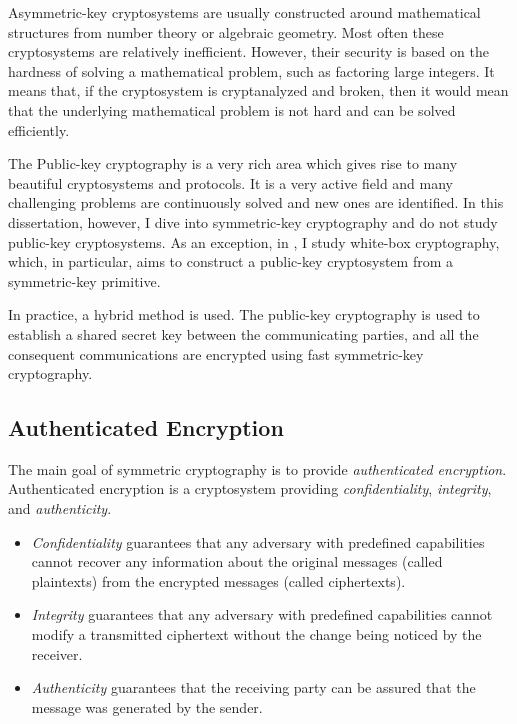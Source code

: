 Asymmetric-key cryptosystems are usually constructed around mathematical structures from number theory or algebraic geometry. Most often these cryptosystems are relatively inefficient. However, their security is based on the hardness of solving a mathematical problem, such as factoring large integers. It means that, if the cryptosystem is cryptanalyzed and broken, then it would mean that the underlying mathematical problem is not hard and can be solved efficiently.

The Public-key cryptography is a very rich area which gives rise to many beautiful cryptosystems and protocols. It is a very active field and many challenging problems are continuously solved and new ones are identified. In this dissertation, however, I dive into symmetric-key cryptography and do not study public-key cryptosystems. As an exception, in , I study white-box cryptography, which, in particular, aims to construct a public-key cryptosystem from a symmetric-key primitive. 

In practice, a hybrid method is used. The public-key cryptography is used to establish a shared secret key between the communicating parties, and all the consequent communications are encrypted using fast symmetric-key cryptography.


\subsection{Authenticated Encryption}

The main goal of symmetric cryptography is to provide \emph{authenticated encryption}. Authenticated encryption is a cryptosystem providing \emph{confidentiality}, \emph{integrity}, and \emph{authenticity}.
\begin{itemize}
    \item \emph{Confidentiality} guarantees that any adversary with predefined capabilities cannot recover any information about the original messages (called plaintexts) from the encrypted messages (called ciphertexts).
    
    \item \emph{Integrity} guarantees that any adversary with predefined capabilities cannot modify a transmitted ciphertext without the change being noticed by the receiver.
    
    \item \emph{Authenticity} guarantees that the receiving party can be assured that the message was generated by the sender.
\end{itemize}

